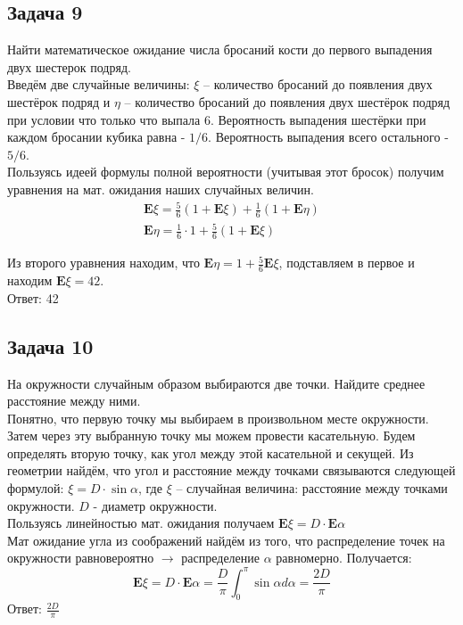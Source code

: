 \documentclass[a4paper,12pt]{article} %
\begin{document}
\subsection*{Задача 9}
Найти математическое ожидание числа бросаний кости до первого выпадения двух шестерок подряд. \smallskip \\

Введём две случайные величины: $ \xi $ -- количество бросаний до появления двух шестёрок подряд и $ \eta $ -- количество бросаний до появления двух шестёрок подряд при условии что только что выпала 6. Вероятность выпадения шестёрки при каждом бросании кубика равна - $ 1/6 $. Вероятность выпадения всего остального - $ 5/6 $.\\
Пользуясь идеей формулы полной вероятности (учитывая этот бросок) получим уравнения на мат. ожидания наших случайных величин. 
$$\begin{array}{c}
\mathbf{E}{\xi}=\frac{5}{6}\left(1+\mathbf{E}{\xi}\right)+\frac{1}{6}\left(1+\mathbf{E}{\eta}\right) \\
\mathbf{E}{\eta}=\frac{1}{6} \cdot 1+\frac{5}{6}\left(1+\mathbf{E}{\xi}\right)
\end{array}$$

Из второго уравнения находим, что $ \mathbf{E}{\eta}= 1+\frac{5}{6}\mathbf{E}{\xi} $, подставляем в первое и находим $ \mathbf{E}{\xi} = 42 $.\\
Ответ: 42


\subsection*{Задача 10}
На окружности случайным образом выбираются две точки. Найдите среднее расстояние между ними. \\

Понятно, что первую точку мы выбираем в произвольном месте окружности. Затем через эту выбранную точку мы можем провести касательную. Будем определять вторую точку, как угол между этой касательной и секущей. Из геометрии найдём, что угол и расстояние между точками связываются следующей формулой: $ \xi = D \cdot \sin\alpha $, где $ \xi $ -- случайная величина: расстояние между точками окружности. $ D $ - диаметр окружности. \\

Пользуясь линейностью мат. ожидания получаем $ \mathbf{E}{\xi} = D \cdot \mathbf{E}{\alpha} $\\
Мат ожидание угла из соображений найдём из того, что распределение точек на окружности равновероятно $ \longrightarrow $ распределение $ \alpha $ равномерно. Получается:
$$
\mathbf{E}{\xi} = D \cdot \mathbf{E}{\alpha} = \frac{D}{\pi} \int_{0}^{\pi} \sin \alpha d \alpha=\frac{2D}{\pi}
$$
Ответ: $ \frac{2D}{\pi} $
\end{document}
